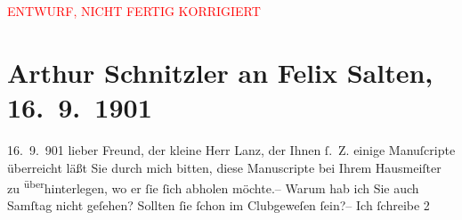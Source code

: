
\begin{center}
            \textcolor{red}{ENTWURF, NICHT FERTIG KORRIGIERT}
                      \end{center}
            
         
         \renewcommand{\erwaehntePersonen}{Personen:  ?? [Hausmeister von Felix Salten in der Kochgasse 1901],  Lanz, Felix Salten}
         \renewcommand{\erwaehnteInstitutionen}{Institutionen: Wiener Schachclub}
         \renewcommand{\erwaehnteOrte}{Orte: Wien}
         \renewcommand{\erwaehnteWerke}{Werke: Der Puppenspieler, Die Frau mit dem Dolche, Die letzten Masken, Lebendige Stunden, Literatur}
               \section[Arthur Schnitzler an Felix Salten, 16. 9. 1901]{ Arthur Schnitzler an Felix Salten, 16. 9. 1901}\nopagebreak{}\rehead{ }\begin{ledgroupsized}[t]{13cm}\normalsize\beginnumbering \toendnotes[C]{\smallbreak\pagebreak[2]} 
\toendnotes[C]{\smallbreak}\pstart
           \raggedleft{}{\pb}16. 9. 901\pend
           \pstart
           lieber Freund, der kleine Herr Lanz, der Ihnen ſ. Z. einige Manuſcripte überreicht läßt Sie durch mich
               bitten, diese Manuscripte bei Ihrem Hausmeiſter zu \substVorne{}\textsuperscript{über}\substDazwischen{}hinter\substHinten{}legen, wo er ſie ſich abholen möchte.– \pend
           \pstart
           Warum hab ich Sie auch Samſtag nicht geſehen? Sollten ſie ſchon im Clubgeweſen ſein?– \pend
           \pstart
           Ich ſchreibe 2

\end{ledgroupsized}
